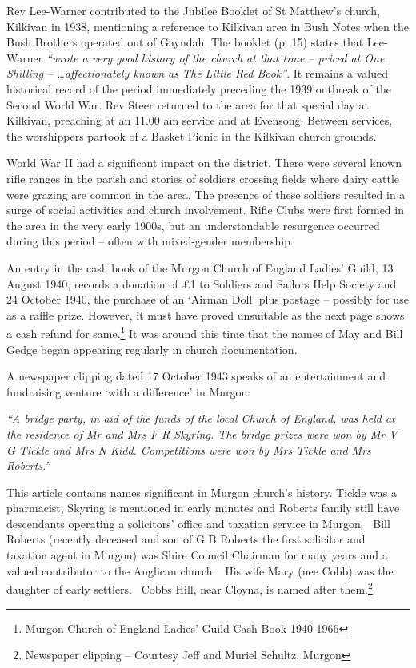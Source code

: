 Rev Lee-Warner contributed to the Jubilee Booklet of St Matthew's church, Kilkivan in 1938, mentioning a reference to Kilkivan area in Bush Notes when the Bush Brothers operated out of Gayndah. The booklet (p. 15) states that Lee-Warner \emph{``wrote a very good history of the church at that time -- priced at One Shilling -- \ldots affectionately known as The Little Red Book''}. It remains a valued historical record of the period immediately preceding the 1939 outbreak of the Second World War. Rev Steer returned to the area for that special day at Kilkivan, preaching at an 11.00 am service and at Evensong. Between services, the worshippers partook of a Basket Picnic in the Kilkivan church grounds.



World War II had a significant impact on the district. There were several known rifle ranges in the parish and stories of soldiers crossing fields where dairy cattle were grazing are common in the area. The presence of these soldiers resulted in a surge of social activities and church involvement. Rifle Clubs were first formed in the area in the very early 1900s, but an understandable resurgence occurred during this period -- often with mixed-gender membership.



An entry in the cash book of the Murgon Church of England Ladies' Guild, 13 August 1940, records a donation of \pounds1 to Soldiers and Sailors Help Society and 24 October 1940, the purchase of an `Airman Doll' plus postage -- possibly for use as a raffle prize. However, it must have proved unsuitable as the next page shows a cash refund for same.\footnote{Murgon Church of England Ladies' Guild Cash Book 1940-1966} It was around this time that the names of May and Bill Gedge began appearing regularly in church documentation.


A newspaper clipping dated 17 October 1943 speaks of an entertainment and fundraising venture `with a difference' in Murgon:



\emph{``A bridge party, in aid of the funds of the local Church of England, was held at the residence of Mr and Mrs F R Skyring. The bridge prizes were won by Mr V G Tickle and Mrs N Kidd. Competitions were won by Mrs Tickle and Mrs Roberts.''}



\smallskip


This article contains names significant in Murgon church's history. Tickle was a pharmacist, Skyring is mentioned in early minutes and Roberts family still have descendants operating a solicitors' office and taxation service in Murgon.~ Bill Roberts (recently deceased and son of G B Roberts the first solicitor and taxation agent in Murgon) was Shire Council Chairman for many years and a valued contributor to the Anglican church.~ His wife Mary (nee Cobb) was the daughter of early settlers.~ Cobbs Hill, near Cloyna, is named after them.\footnote{Newspaper clipping -- Courtesy Jeff and Muriel Schultz, Murgon}


